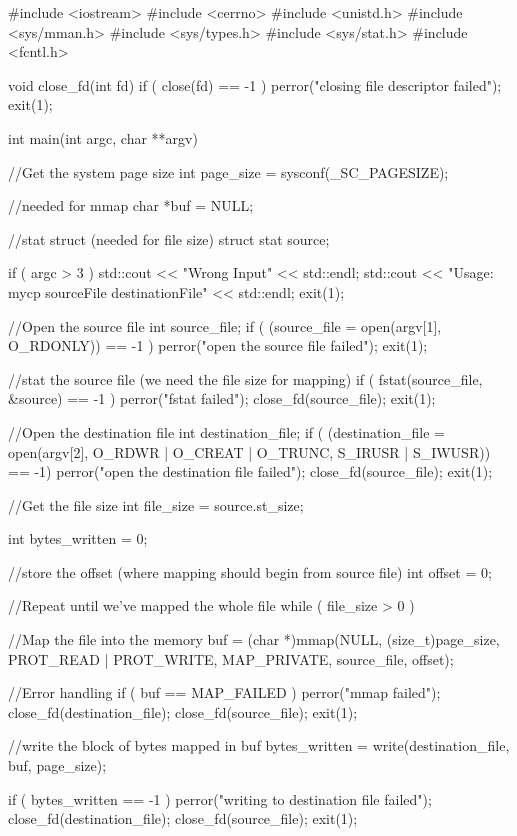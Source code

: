\documentclass{ti2}
\begin{document}
\begin{listing}{1}
#include <iostream>
#include <cerrno>
#include <unistd.h>
#include <sys/mman.h>
#include <sys/types.h>
#include <sys/stat.h>
#include <fcntl.h>

void close_fd(int fd) {
  if ( close(fd) == -1 ) {
    perror("closing file descriptor failed");
    exit(1);
  }
}

int main(int argc, char **argv) {
  //Get the system page size
  int page_size = sysconf(_SC_PAGESIZE);
  
  //needed for mmap
  char *buf = NULL;

  //stat struct (needed for file size)
  struct stat source;

  if ( argc > 3 ) {
    std::cout << "Wrong Input" << std::endl;
    std::cout << "Usage: mycp sourceFile destinationFile" << std::endl;
    exit(1);
  }

  //Open the source file
  int source_file;
  if ( (source_file = open(argv[1], O_RDONLY)) == -1 ) {
    perror("open the source file failed");
    exit(1);
  }

  //stat the source file (we need the file size for mapping)
  if ( fstat(source_file, &source) == -1 ) {
    perror("fstat failed");
    close_fd(source_file);
    exit(1);
  }

  //Open the destination file
  int destination_file;
  if ( (destination_file = open(argv[2], O_RDWR | O_CREAT | O_TRUNC, S_IRUSR |
				S_IWUSR)) == -1) {
    perror("open the destination file failed");
    close_fd(source_file);
    exit(1);
  }
  
  //Get the file size
  int file_size = source.st_size;

  int bytes_written = 0;


  //store the offset (where mapping should begin from source file)
  int offset = 0;

  //Repeat until we've mapped the whole file
  while ( file_size > 0 ) {

    //Map the file into the  memory
    buf = (char *)mmap(NULL, (size_t)page_size, PROT_READ | PROT_WRITE, MAP_PRIVATE,
		       source_file, offset);

    //Error handling
    if ( buf == MAP_FAILED ) {
      perror("mmap failed");
      close_fd(destination_file);
      close_fd(source_file);
      exit(1);
    }
    
    //write the block of bytes mapped in buf
    bytes_written = write(destination_file, buf, page_size);

    if ( bytes_written == -1 ) {
      perror("writing to destination file failed");
      close_fd(destination_file);
      close_fd(source_file);
      exit(1);
    }

}}
\end{listing}
\end{document}
